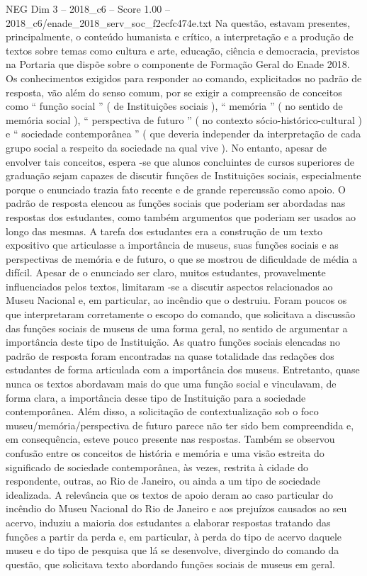 \begin{textsample}{NEG Dim 3 – 2018\_c6 – Score 1.00 – 2018\_c6/enade\_2018\_serv\_soc\_f2ecfc474e.txt}
Na questão, estavam presentes, principalmente, o conteúdo humanista e crítico, a interpretação e a produção de textos sobre temas como cultura e arte, educação, ciência e democracia, previstos na Portaria que dispõe sobre o componente de Formação Geral do Enade 2018.
Os conhecimentos exigidos para responder ao comando, explicitados no padrão de resposta, vão além do senso comum, por se exigir a compreensão de conceitos como “ função social ” ( de Instituições sociais ), “ memória ” ( no sentido de memória social ), “ perspectiva de futuro ” ( no contexto sócio-histórico-cultural ) e “ sociedade contemporânea ” ( que deveria independer da interpretação de cada grupo social a respeito da sociedade na qual vive ).
No entanto, apesar de envolver tais conceitos, espera -se que alunos concluintes de cursos superiores de graduação sejam capazes de discutir funções de Instituições sociais, especialmente porque o enunciado trazia fato recente e de grande repercussão como apoio.
O padrão de resposta elencou as funções sociais que poderiam ser abordadas nas respostas dos estudantes, como também argumentos que poderiam ser usados ao longo das mesmas.
A tarefa dos estudantes era a construção de um texto expositivo que articulasse a importância de museus, suas funções sociais e as perspectivas de memória e de futuro, o que se mostrou de dificuldade de média a difícil.
Apesar de o enunciado ser claro, muitos estudantes, provavelmente influenciados pelos textos, limitaram -se a discutir aspectos relacionados ao Museu Nacional e, em particular, ao incêndio que o destruiu.
Foram poucos os que interpretaram corretamente o escopo do comando, que solicitava a discussão das funções sociais de museus de uma forma geral, no sentido de argumentar a importância deste tipo de Instituição.
As quatro funções sociais elencadas no padrão de resposta foram encontradas na quase totalidade das redações dos estudantes de forma articulada com a importância dos museus.
Entretanto, quase nunca os textos abordavam mais do que uma função social e vinculavam, de forma clara, a importância desse tipo de Instituição para a sociedade contemporânea.
Além disso, a solicitação de contextualização sob o foco museu/memória/perspectiva de futuro parece não ter sido bem compreendida e, em consequência, esteve pouco presente nas respostas.
Também se observou confusão entre os conceitos de história e memória e uma visão estreita do significado de sociedade contemporânea, às vezes, restrita à cidade do respondente, outras, ao Rio de Janeiro, ou ainda a um tipo de sociedade idealizada.
A relevância que os textos de apoio deram ao caso particular do incêndio do Museu Nacional do Rio de Janeiro e aos prejuízos causados ao seu acervo, induziu a maioria dos estudantes a elaborar respostas tratando das funções a partir da perda e, em particular, à perda do tipo de acervo daquele museu e do tipo de pesquisa que lá se desenvolve, divergindo do comando da questão, que solicitava texto abordando funções sociais de museus em geral.

\end{textsample}
